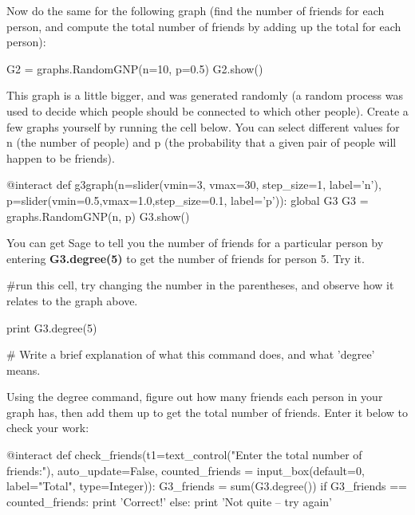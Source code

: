 Now do the same for the following graph (find the number of friends
for each person, and compute the total number of friends by adding up
the total for each person):
\begin{sageverbatim}
G2 = graphs.RandomGNP(n=10, p=0.5)
G2.show()
\end{sageverbatim}

This graph is a little bigger, and was generated randomly (a random
process was used to decide which people should be connected to which
other people).  Create a few graphs yourself by running the cell
below.  You can select different values for n (the number of people)
and p (the probability that a given pair of people will happen to be
friends).

\begin{sageverbatim}
@interact
def g3graph(n=slider(vmin=3, vmax=30, step_size=1, label='n'), p=slider(vmin=0.5,vmax=1.0,step_size=0.1, label='p')):
    global G3 
    G3 = graphs.RandomGNP(n, p)
    G3.show()
\end{sageverbatim}

You can get Sage to tell you the number of friends for a particular person by entering \textbf{G3.degree(5)}
to get the number of friends for person 5.  Try it.

\begin{sageverbatim}
#run this cell, try changing the number in the parentheses, and observe how it relates to the graph above.

print G3.degree(5)

# Write a brief explanation of what this command does, and what 'degree' means.
\end{sageverbatim}

Using the degree command, figure out how many friends each person in
your graph has, then add them up to get the total number of friends.
Enter it below to check your work:

\begin{sageverbatim}
@interact
def check_friends(t1=text_control("Enter the total number of friends:"), auto_update=False, 
    counted_friends = input_box(default=0, label="Total", type=Integer)):
    G3_friends = sum(G3.degree())
    if G3_friends == counted_friends:
        print 'Correct!'
    else:
        print 'Not quite -- try again'
\end{sageverbatim}


%









